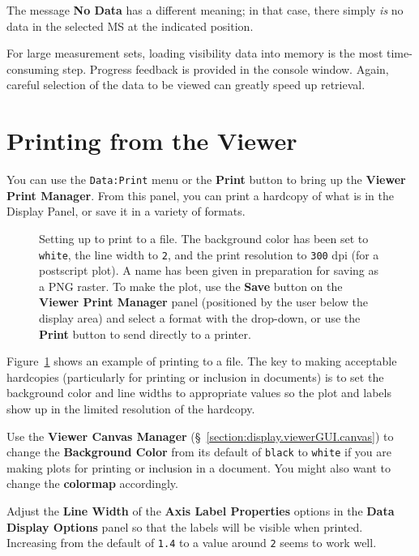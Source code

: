 The message {\bf No Data} has a different meaning; in that
case, there simply {\it is} no data in the selected MS at the
indicated position.

For large measurement sets, loading visibility data into memory is the
most time-consuming step.  Progress feedback is provided in the
console window.  Again, careful selection of the data to be viewed can
greatly speed up retrieval.

\section{Printing from the Viewer}
\label{section:display.print}

You can use the {\tt Data:Print} menu or the {\bf Print} button to
bring up the {\bf Viewer Print Manager}.  From this panel, you can
print a hardcopy of what is in the Display Panel, or save it in a 
variety of formats.

\begin{figure}[h!]
\begin{center}
\caption{\label{fig:viewer_print} Setting up to print to a file.
The background color has been set to {\tt white}, the line width
to {\tt 2}, and the print resolution to {\tt 300} dpi (for a
postscript plot).  A name has been given in preparation for saving
as a PNG raster.  To make the plot, use the {\bf Save} button on
the {\bf Viewer Print Manager} panel (positioned by the user below
the display area) and select a format with the drop-down, or 
use the {\bf Print} button to send directly to a printer.
} 
\hrulefill
\end{center}
\end{figure}

Figure~\ref{fig:viewer_print} shows an example of printing to a file.
The key to making acceptable hardcopies (particularly for printing
or inclusion in documents) is to set the background color and line
widths to appropriate values so the plot and labels show up in the
limited resolution of the hardcopy.

Use the {\bf Viewer Canvas Manager} 
(\S~\ref{section:display.viewerGUI.canvas}) to change the 
{\bf Background Color} from its default of {\tt black} to
{\tt white} if you are making plots for printing or inclusion in
a document.  You might also want to change the {\bf colormap}
accordingly.

Adjust the {\bf Line Width} of the {\bf Axis Label Properties}
options in the {\bf Data Display Options} panel so that the
labels will be visible when printed.  Increasing from the default
of {\tt 1.4} to a value around {\tt 2} seems to work well.

